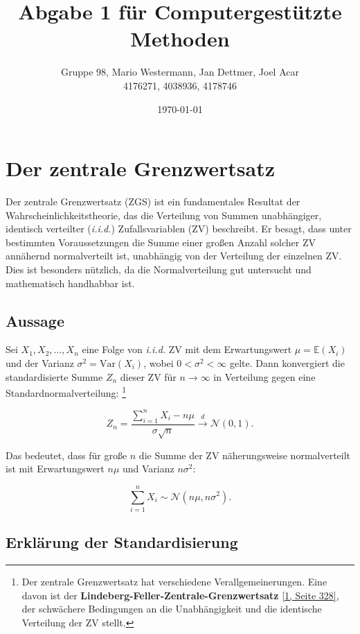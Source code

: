 \documentclass{article}
\title{Abgabe 1 für Computergestützte Methoden}
\author{Gruppe 98, Mario Westermann, Jan Dettmer, Joel Acar\\4176271, 4038936, 4178746}
\date{\today}
\begin{document}
\maketitle

\tableofcontents

\newpage

\section{Der zentrale Grenzwertsatz}

Der zentrale Grenzwertsatz (ZGS) ist ein fundamentales Resultat der Wahrscheinlichkeitstheorie, 
das die Verteilung von Summen unabhängiger, identisch verteilter (\textit{i.i.d.}) Zufallsvariablen (ZV) beschreibt.
Er besagt, dass unter bestimmten Voraussetzungen die Summe einer großen Anzahl solcher ZV
annähernd normalverteilt ist, unabhängig von der Verteilung der einzelnen ZV. Dies ist besonders nützlich, da die Normalverteilung gut untersucht und mathematisch handhabbar ist.

\subsection{Aussage}

Sei \( X_1, X_2, \ldots, X_n \) eine Folge von \textit{i.i.d.} ZV mit dem Erwartungswert \(\mu = \mathbb{E}(X_i)\) und der Varianz \(\sigma^2 = \text{Var}(X_i)\), wobei \( 0 < \sigma^2 < \infty \) gelte. Dann konvergiert die standardisierte Summe \( Z_n \) dieser ZV für \( n \to \infty \) in Verteilung gegen eine Standardnormalverteilung: \footnote{\label{footnote-gwz}Der zentrale Grenzwertsatz hat verschiedene Verallgemeinerungen. Eine davon ist der \textbf{Lindeberg-Feller-Zentrale-Grenzwertsatz} \hyperlink{Klenke2013}{[1, Seite 328]}, der schwächere Bedingungen an die Unabhängigkeit und die identische Verteilung der ZV stellt.}

\[
Z_n = \frac{\sum_{i=1}^n X_i - n\mu}{\sigma \sqrt{n}} \overset{d}{\to} \mathcal{N}(0,1). \tag{1} \label{eq:formel1}
\]

Das bedeutet, dass für große \( n \) die Summe der ZV näherungsweise normalverteilt ist mit Erwartungswert \( n\mu \) und Varianz \( n\sigma^2 \):

\[
\sum_{i=1}^n X_i \sim \mathcal{N}(n\mu, n\sigma^2). \tag{2} \label{eq:formel2}
\]

\subsection{Erklärung der Standardisierung}
\end{document}
